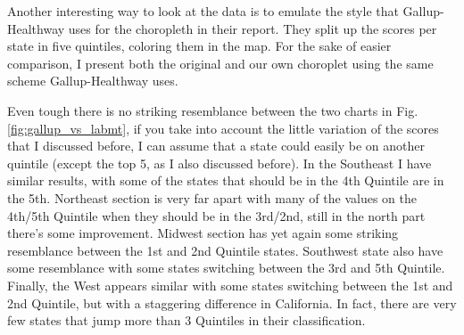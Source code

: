 \documentclass{llncs}
\begin{document}
Another interesting way to look at the data is to emulate the style that Gallup-Healthway uses for the choropleth in their report. They split up the scores per state in five quintiles, coloring them in the map. For the sake of easier comparison, I present both the original and our own choroplet using the same scheme Gallup-Healthway uses.

Even tough there is no striking resemblance between the two charts in Fig. \ref{fig:gallup_vs_labmt}, if you take into account the little variation of the scores that I discussed before, I can assume that a state could easily be on another quintile (except the top 5, as I also discussed before). In the Southeast I have similar results, with some of the states that should be in the 4th Quintile are in the 5th. Northeast section is very far apart with many of the values on the 4th/5th Quintile when they should be in the 3rd/2nd, still in the north part there's some improvement. Midwest section has yet again some striking resemblance between the 1st and 2nd Quintile states. Southwest state also have some resemblance with some states switching between the 3rd and 5th Quintile. Finally, the West appears similar with some states switching between the 1st and 2nd Quintile, but with a staggering difference in California. In fact, there are very few states that jump more than 3 Quintiles in their classification.
\end{document}
